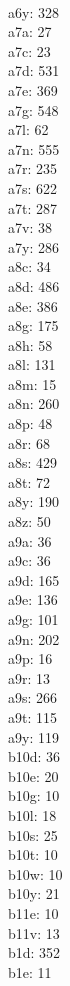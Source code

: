 \begin{multicols}{8}
  \\a6y: 328
  \\a7a: 27
  \\a7c: 23
  \\a7d: 531
  \\a7e: 369
  \\a7g: 548
  \\a7l: 62
  \\a7n: 555
  \\a7r: 235
  \\a7s: 622
  \\a7t: 287
  \\a7v: 38
  \\a7y: 286
  \\a8c: 34
  \\a8d: 486
  \\a8e: 386
  \\a8g: 175
  \\a8h: 58
  \\a8l: 131
  \\a8m: 15
  \\a8n: 260
  \\a8p: 48
  \\a8r: 68
  \\a8s: 429
  \\a8t: 72
  \\a8y: 190
  \\a8z: 50
  \\a9a: 36
  \\a9c: 36
  \\a9d: 165
  \\a9e: 136
  \\a9g: 101
  \\a9n: 202
  \\a9p: 16
  \\a9r: 13
  \\a9s: 266
  \\a9t: 115
  \\a9y: 119
  \\b10d: 36
  \\b10e: 20
  \\b10g: 10
  \\b10l: 18
  \\b10s: 25
  \\b10t: 10
  \\b10w: 10
  \\b10y: 21
  \\b11e: 10
  \\b11v: 13
  \\b1d: 352
  \\b1e: 11

\end{multicols}

